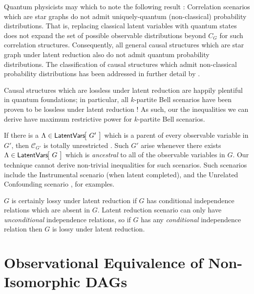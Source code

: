 Quantum physicists may which to note the following result \citep[Thm.~3.8]{fritz2012bell}: Correlation scenarios which are star graphs \citep[Fig.~6]{fritz2012bell} do not admit uniquely-quantum (non-classical) probability distributions. That is, replacing classical latent variables with quantum states does not expand the set of possible observable distributions beyond $C_G$ for such correlation structures. Consequently, all general causal structures which are star graph under latent reduction also do not admit quantum probability distributions. The classification of causal structures which admit non-classical probability distributions has been addressed in further detail by \citet{pusey2014gdag}. 

Causal structures which are lossless under latent reduction are happily plentiful in quantum foundations; in particular, all $k$-partite Bell scenarios have been proven to be lossless under latent reduction \citep[Thm.~2.24]{fritz2012bell}! As such, our the inequalities we can derive have maximum restrictive power for $k$-partite Bell scenarios.

If there is a ${\Lambda\in \NamedFunction{LatentVars}{\!G'\!}}$ which is a parent of every observable variable in $G'$, then $\mathcal{C}_{G'}$ is totally unrestricted \citep[Prop.~3.7]{fritz2012bell}. Such $G'$ arise whenever there exists ${\Lambda\in \NamedFunction{LatentVars}{\!G\!}}$ which is \emph{ancestral} to all of the observable variables in $G$. Our technique cannot derive non-trivial inequalities for such scenarios. Such scenarios include the Instrumental scenario \cite{pearl2009causality,spirtes2011causation,studeny2005probabilistic,koller2009probabilistic} (when latent completed), and the Unrelated Confounding scenario \cite{evans2012graphical}, for examples. 

$G$ is certainly lossy under latent reduction if $G$ has conditional independence relations which are absent in $G$. Latent reduction scenario can only have \emph{unconditional} independence relations, so if $G$ has any \emph{conditional} independence relation then $G$ is lossy under latent reduction. 



\section{Observational Equivalence of Non-Isomorphic DAGs }\label{sec:OE}

